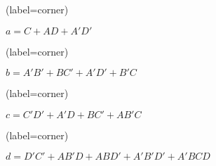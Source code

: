\begin{enumerate}
	
	
	\begin{latin}
		\begin{minipage}{0.48\textwidth}
			\centering
			\begin{karnaugh-map}[4][4][1][$B$][$A$][$D$][$C$](label=corner)
				
			\end{karnaugh-map}

			$a=C+AD+A'D'$
		\end{minipage}
		\hfill
		\begin{minipage}{0.48\textwidth}
			\centering
			\begin{karnaugh-map}[4][4][1][$B$][$A$][$D$][$C$](label=corner)
			\end{karnaugh-map}

			$b=A'B'+BC'+A'D'+B'C$
		\end{minipage}	
	\end{latin}
	
	
	
	
	
	\begin{latin}
		\begin{minipage}{0.48\textwidth}
			\centering
			\begin{karnaugh-map}[4][4][1][$B$][$A$][$D$][$C$](label=corner)
				
			\end{karnaugh-map}

			$c=C'D'+A'D+BC'+AB'C$
		\end{minipage}
		\hfill
		\begin{minipage}{0.48\textwidth}
			\centering
			\begin{karnaugh-map}[4][4][1][$B$][$A$][$D$][$C$](label=corner)
			\end{karnaugh-map}

			$d=D'C'+AB'D+ABD'+A'B'D'+A'BCD$
		\end{minipage}	
	\end{latin}
	

\end{enumerate}
